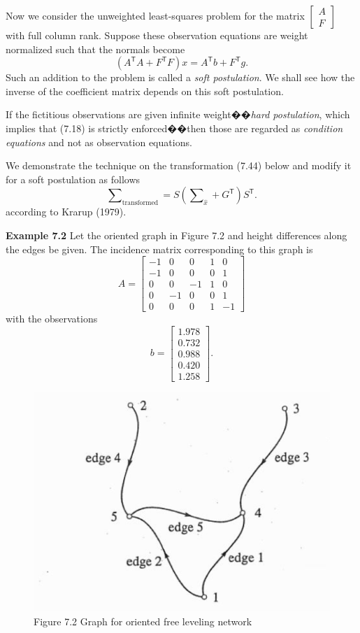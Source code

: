 Now we consider the unweighted least-squares problem for the matrix
$\begin{bmatrix}
A\\
F
\end{bmatrix}$
with full column rank. Suppose these observation equations are weight normalized such that the normals become
\begin{equation}
	(A^\mathsf{T}A + F^\mathsf{T}F)x
	=A^\mathsf{T}b + F^\mathsf{T}g.
\end{equation}
Such an addition to the problem is called a \emph{soft postulation}. We shall see how the inverse of the coefficient matrix depends on this soft postulation.
\par
If the fictitious observations are given infinite weight��\emph{hard postulation}, which implies that (7.18) is strictly enforced��then those are regarded as \emph{condition equations} and not as observation equations.
\par
We demonstrate the technique on the transformation (7.44) below and modify it for a soft postulation as follows
\begin{equation}
	\sum\nolimits_{\text{transformed}}
	=S(\sum\nolimits_{\hat{x}} + G^\mathsf{T})S^\mathsf{T}.
\end{equation}
according to Krarup (1979).
\par\noindent
\textbf{Example 7.2} Let the oriented graph in Figure 7.2 and height differences along the edges be given. The incidence matrix corresponding to this graph is
\begin{equation*}
	A
	=
	\begin{bmatrix}
		-1 & 0 & 0 & 1 & 0\\
		-1 & 0 & 0 & 0 & 1\\
		0 & 0 &-1 & 1 & 0\\
		0 &-1 & 0 & 0 & 1\\
		0 & 0 & 0 & 1 & -1
	\end{bmatrix}
\end{equation*}
with the observations
\begin{equation*}
	b
	=
	\begin{bmatrix}
		1.978\\
		0.732\\
		0.988\\
		0.420\\
		1.258
	\end{bmatrix}.
\end{equation*}
\begin{figure}
	\centering
	\includegraphics[width=0.4\linewidth]{TeX_files/Part02/chapter07/image/7-2.png}
	\caption{Figure 7.2 Graph for oriented free leveling network}
	\label{fig:7-2}
\end{figure}
